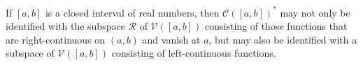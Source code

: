 If $[a, b]$ is a closed interval of real numbers, then $\mathcal{C}([a, b])^*$ may not only be identified with the subspace $\mathcal{R}$ of $\mathcal{V}([a, b])$ consisting of those functions that are right-continuous on $(a, b)$ and vanish at $a$, but may also be identified with a subspace of $\mathcal{V}([a, b])$ consisting of left-continuous functions.
